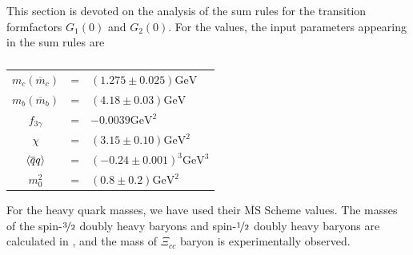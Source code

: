 \label{chp:rslts12}

This section is devoted on the analysis of the sum rules for the transition formfactors $G_1(0)$ and $G_2(0)$. For the values, the input parameters appearing in the sum rules are

\begin{table}[!ht]
    \centering
    \begin{tabular}{crl}
        $m_c\left(\overline{m}_c\right)$ &=& $\left(1.275 \pm 0.025\right) \text{GeV}$ \cite{PDG} \\
        $m_b\left(\overline{m}_b\right)$ &=& $\left(4.18 \pm 0.03\right) \text{GeV}$ \cite{PDG} \\
        $f_{3\gamma}$ &=& $-0.0039 \text{GeV}^2$ \cite{PhotonDA} \\
        $\chi$ &=& $\left(3.15\pm0.10\right) \text{GeV}^2$ \cite{PhotonDA} \\
        $\left\langle\overline{q}q\right\rangle$ &=& $\left(-0.24 \pm 0.001\right)^3 \text{GeV}^3$ \cite{ioffeCondensate} \\
        $m_0^2$ &=& $\left(0.8 \pm 0.2\right) \text{GeV}^2$ \cite{SVZ}
    \end{tabular}
    \caption*{}
    \label{inputParams}
\end{table}
%
For the heavy quark masses, we have used their $\overline{\text{MS}}$ Scheme values. The masses of the spin-$\nicefrac{3}{2}$ doubly heavy baryons and spin-$\nicefrac{1}{2}$ doubly heavy baryons are calculated in \cite{lattice_masses,AlievOctet,AlievDecuplet}, and the mass of $\Xi_{cc}$ baryon is experimentally observed.

